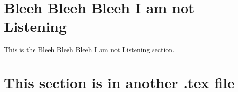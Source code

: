\documentclass[]{article}
\begin{document}
        

\appendix
\section{Bleeh Bleeh Bleeh I am not Listening}
    This is the Bleeh Bleeh Bleeh I am not Listening section. 

\section{This section is in another .tex file} 
    





\end{document}
